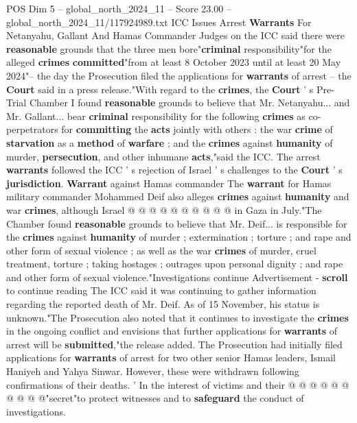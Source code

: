 \begin{textsample}{POS Dim 5 – global\_north\_2024\_11 – Score 23.00 – global\_north\_2024\_11/117924989.txt}  \label{ex:f5_pos_032}
ICC Issues Arrest \textbf{Warrants} For Netanyahu, Gallant And Hamas Commander Judges on the ICC said there were \textbf{reasonable} grounds that the three men bore"\textbf{criminal} responsibility"for the alleged \textbf{crimes} \textbf{committed}"from at least 8 October 2023 until at least 20 May 2024"-- the day the Prosecution filed the applications for \textbf{warrants} of arrest -- the \textbf{Court} said in a press release."With regard to the \textbf{crimes}, the \textbf{Court} ' s Pre-Trial Chamber I found \textbf{reasonable} grounds to believe that Mr.
Netanyahu... and Mr.
Gallant... bear \textbf{criminal} responsibility for the following \textbf{crimes} as co-perpetrators for \textbf{committing} the \textbf{acts} jointly with others : the war \textbf{crime} of \textbf{starvation} as a \textbf{method} of \textbf{warfare} ; and the \textbf{crimes} against \textbf{humanity} of murder, \textbf{persecution}, and other inhumane \textbf{acts},"said the ICC.
The arrest \textbf{warrants} followed the ICC ' s rejection of Israel ' s challenges to the \textbf{Court} ' s \textbf{jurisdiction}. \textbf{Warrant} against Hamas commander The \textbf{warrant} for Hamas military commander Mohammed Deif also alleges \textbf{crimes} against \textbf{humanity} and war \textbf{crimes}, although Israel @ @ @ @ @ @ @ @ @ @ in Gaza in July."The Chamber found \textbf{reasonable} grounds to believe that Mr.
Deif... is responsible for the \textbf{crimes} against \textbf{humanity} of murder ; extermination ; torture ; and rape and other form of sexual violence ; as well as the war \textbf{crimes} of murder, cruel treatment, torture ; taking hostages ; outrages upon personal dignity ; and rape and other form of sexual violence."Investigations continue Advertisement - \textbf{scroll} to continue reading The ICC said it was continuing to gather information regarding the reported death of Mr.
Deif.
As of 15 November, his status is unknown."The Prosecution also noted that it continues to investigate the \textbf{crimes} in the ongoing conflict and envisions that further applications for \textbf{warrants} of arrest will be \textbf{submitted},"the release added.
The Prosecution had initially filed applications for \textbf{warrants} of arrest for two other senior Hamas leaders, Ismail Haniyeh and Yahya Sinwar.
However, these were withdrawn following confirmations of their deaths. ' In the interest of victims and their @ @ @ @ @ @ @ @ @ @"secret"to protect witnesses and to \textbf{safeguard} the conduct of investigations.

\end{textsample}
